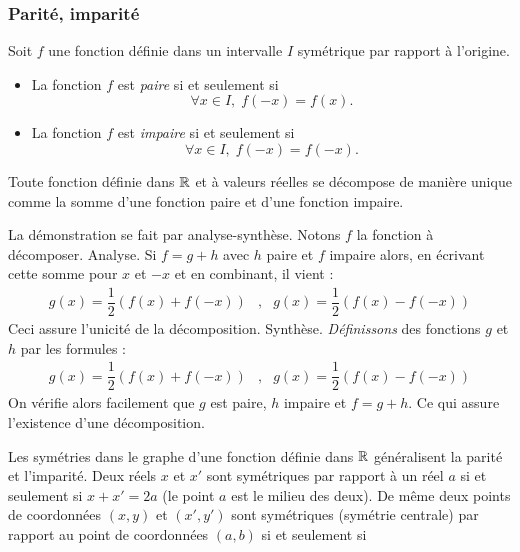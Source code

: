 \subsubsection{Parité, imparité}
 
\begin{defi}
 Soit $f$ une fonction définie dans un intervalle $I$ symétrique par rapport à l'origine.
 \begin{itemize}
  \item La fonction $f$ est \emph{paire} si et seulement si 
  \begin{displaymath}
   \forall x\in I, \; f(-x) = f(x).
  \end{displaymath}
  \item La fonction $f$ est \emph{impaire} si et seulement si 
  \begin{displaymath}
   \forall x\in I, \; f(-x) = f(-x).
  \end{displaymath}
 \end{itemize}
\end{defi}
\begin{prop}
 Toute fonction définie dans $\mathbb{R}$ et à valeurs réelles se décompose de manière unique comme la somme d'une fonction paire et d'une fonction impaire.
\end{prop}
\begin{demo}
 La démonstration se fait par analyse-synthèse. Notons $f$ la fonction à décomposer.\newline
Analyse. Si $f=g+h$ avec $h$ paire et $f$ impaire alors, en écrivant cette somme pour $x$ et $-x$ et en combinant, il vient :
\begin{align*}
 g(x)=\dfrac{1}{2}(f(x)+f(-x)) &,& g(x)=\dfrac{1}{2}(f(x)-f(-x))
\end{align*}
Ceci assure l'unicité de la décomposition.\newline
Synthèse. \emph{Définissons} des fonctions $g$ et $h$ par les formules :
\begin{align*}
 g(x)=\dfrac{1}{2}(f(x)+f(-x)) &,& g(x)=\dfrac{1}{2}(f(x)-f(-x))
\end{align*}
On vérifie alors facilement que $g$ est paire, $h$ impaire et $f=g+h$. Ce qui assure l'existence d'une décomposition. 
\end{demo}
Les symétries dans le graphe d'une fonction définie dans $\mathbb{R}$ généralisent la parité et l'imparité.
Deux réels $x$ et $x'$ sont symétriques par rapport à un réel $a$ si et seulement si $x+x' = 2a$ (le point $a$ est le milieu des deux). De même deux points de coordonnées $(x,y)$ et $(x',y')$ sont symétriques (symétrie centrale)  par rapport au point de coordonnées $(a,b)$ si et seulement si 

